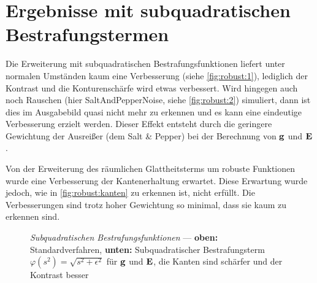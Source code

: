 \section{Ergebnisse mit subquadratischen Bestrafungstermen}

Die Erweiterung mit subquadratischen Bestrafungsfunktionen liefert unter normalen Umständen kaum eine Verbesserung (siehe \autoref{fig:robust:1}), lediglich der Kontrast und die Konturenschärfe wird etwas verbessert. Wird hingegen auch noch Rauschen (hier \gls{SaltAndPepperNoise}, siehe \autoref{fig:robust:2}) simuliert, dann ist dies im Ausgabebild quasi nicht mehr zu erkennen und es kann eine eindeutige Verbesserung erzielt werden. Dieser Effekt entsteht durch die geringere Gewichtung der Ausreißer (dem Salt \& Pepper) bei der Berechnung von $\mathbf g$ und $\mathbf E$.


Von der Erweiterung des räumlichen Glattheitsterms um robuste Funktionen wurde eine Verbesserung der Kantenerhaltung erwartet. Diese Erwartung wurde jedoch, wie in \autoref{fig:robust:kanten} zu erkennen ist, nicht erfüllt. Die Verbesserungen sind trotz hoher Gewichtung so minimal, dass sie kaum zu erkennen sind.


\begin{figure}
  \begin{center}
    
    \caption{\textit{Subquadratischen Bestrafungsfunktionen} --- \textbf{oben:} Standardverfahren, \textbf{unten:} Subquadratischer Bestrafungsterm $\varphi(s^2)=\sqrt{s^2+\epsilon^2}$ für $\mathbf g$ und $\mathbf E$, die Kanten sind schärfer und der Kontrast besser}
    \label{fig:robust:1}
  \end{center}
\end{figure}


